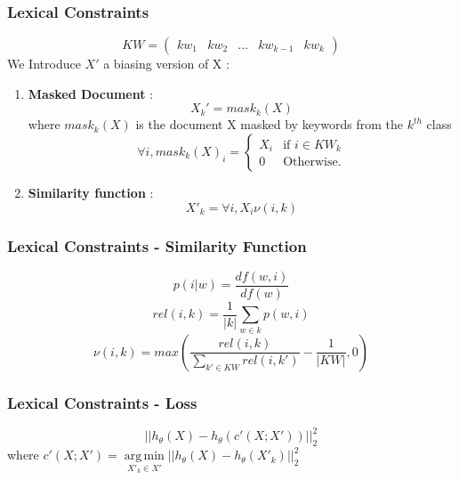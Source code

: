 \documentclass{beamer}
\DeclareMathOperator*{\argmin}{arg\,min}
\begin{document}
\begin{frame}
\frametitle{Lexical Constraints}
\begin{equation*}
  KW = \begin{pmatrix} kw_1 & kw_2 & ... & kw_{k-1} & kw_{k}
\end {pmatrix}
\end{equation*}
We Introduce $X'$ a biasing version of X :
\begin{enumerate}
\item \textbf{Masked Document} :
\begin{equation*}
X_k' = mask_k(X) 
\end{equation*}
where $mask_k(X)$ is the document X masked by keywords from the $k^{th}$ class
\begin{equation*}
\forall i, mask_k(X)_i = \left\{
\begin{array}{ll}
  X_i & \mbox{if } i \in KW_k\\
  0 & \mbox{Otherwise.}
\end{array}
\right. 
\end{equation*}
\item \textbf{Similarity function} :
\begin{equation*}
   X'_k = \forall i, X_i \nu(i,k) 
\end{equation*}
\end{enumerate}
\end{frame}

\begin{frame}
\frametitle{Lexical Constraints - Similarity Function}
\begin{equation*}\label{sim}
p(i|w) = \frac{df(w,i)}{df(w)}
\end{equation*}
\begin{equation*}\label{rel}
  rel(i,k) = \frac{1}{|k|} \sum\limits_{w \in k} p(w,i)
\end{equation*}
\begin{equation*}\label{nu}
  \nu(i,k) = max \left(\frac{rel(i,k)}{\sum\limits_{k' \in KW}rel(i,k')} - \frac{1}{|KW|}, 0\right)
\end{equation*}
\end{frame}

\begin{frame}
\frametitle{Lexical Constraints - Loss}
\begin{equation*}
|| h_\theta(X) - h_\theta(c'(X ; X' )) ||_2^2
\end{equation*}
where $c'(X ; X') = \argmin\limits_{X'_k \in X'}
||h_\theta(X) - h_\theta(X'_k) ||_2^2$
\end{frame}
\end{document}
